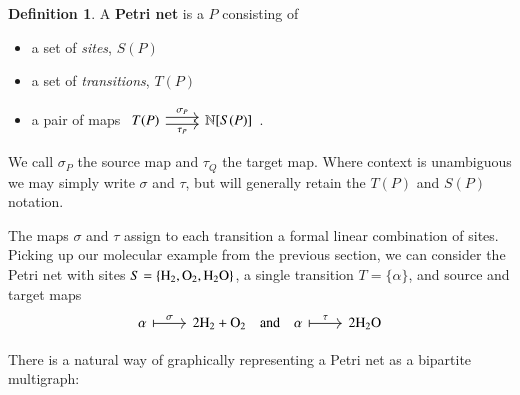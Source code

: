 \documentclass[aps,prd,onecolumn,nofootinbib,letterpaper,preprintnumbers,superscriptaddress,eqsecnum]{revtex4}
\theoremstyle{definition}
\newtheorem{definition}{Definition}
\newcommand{\N}{\mathbb{N}}
\begin{document}
\begin{definition}\label{def:petri}
    A \textbf{Petri net} is a $P$ consisting of
    \begin{itemize}
        \item a set of \textit{sites}, $S(P)$
        \item a set of \textit{transitions}, $T(P)$
        \item a pair of maps $\begin{tikzcd}
                T(P)
                \arrow[r, shift left = 1, "\sigma_P"]
                \arrow[r, shift right = 1, "\tau_P", swap]
                &
                \N[S(P)]
        \end{tikzcd}$.
    \end{itemize}
    We call $\sigma_P$ the source map and $\tau_Q$ the target map.
    Where context is unambiguous we may simply write $\sigma$ and $\tau$, but will generally retain the $T(P)$ and $S(P)$ notation.
\end{definition}

The maps $\sigma$ and $\tau$ assign to each transition a formal linear combination of sites.
Picking up our molecular example from the previous section, we can consider the Petri net with sites $S = \{\ce{H_2}, \ce{O_2}, \ce{H_2O}\}$, a single transition $T = \{\alpha\}$, and source and target maps
\begin{equation*}
    \begin{tikzcd}
        \alpha \arrow[r, mapsto, "\sigma"] & 2\ce{H_2} + \ce{O_2}
        \quad\textrm{and}\quad
        \alpha \arrow[r, mapsto, "\tau"] & 2\ce{H_2O}
    \end{tikzcd}
\end{equation*}

There is a natural way of graphically representing a Petri net as a bipartite multigraph:

\begin{center}
\end{center}
\end{document}
